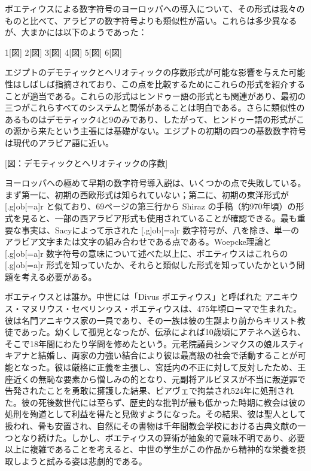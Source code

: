 \documentclass[a4paper,11pt,openany]{ltjsbook}
\begin{document}
ボエティウスによる数字符号のヨーロッパへの導入について、その形式は我々のものと比べて、アラビアの数字符号よりも類似性が高い。これらは多少異なるが、大まかには以下のようであった：

1[図]
  2[図]
  3[図]
  4[図]
  5[図]
  6[図]

エジプトのデモティックとヘリオティックの序数形式が可能な影響を与えた可能性はしばしば指摘されており、この点を比較するためにこれらの形式を紹介することが適当である。これらの形式はヒンドゥー語の形式とも関連があり、最初の三つがこれらすべてのシステムと関係があることは明白である。さらに類似性のあるものはデモティック4と9のみであり、したがって、ヒンドゥー語の形式がこの源から来たという主張には基礎がない。エジプトの初期の四つの基数数字符号は現代のアラビア語に近い。

[図：デモティックとヘリオティックの序数]

ヨーロッパへの極めて早期の数字符号導入説は、いくつかの点で失敗している。まず第一に、初期の西欧形式は知られていない；第二に、初期の東洋形式が [.g]ob[=a]r と似ており、69ページの第三行から Shiraz の手稿（約970年頃）の形式を見ると、一部の西アラビア形式も使用されていることが確認できる。最も重要な事実は、Sacyによって示された [.g]ob[=a]r 数字符号が、八を除き、単一のアラビア文字または文字の組み合わせである点である。Woepcke理論と [.g]ob[=a]r 数字符号の意味について述べた以上に、ボエティウスはこれらの [.g]ob[=a]r 形式を知っていたか、それらと類似した形式を知っていたかという問題を考える必要がある。

ボエティウスとは誰か。中世には「Divus ボエティウス」と呼ばれた アニキウス・マヌリウス・セベリンゥス・ボエティウスは、475年頃ローマで生まれた。彼は名門アニキウス家の一員であり、その一族は彼の生誕より前からキリスト教徒であった。幼くして孤児となったが、伝承によれば10歳頃にアテネへ送られ、そこで18年間にわたり学問を修めたという。元老院議員シンマクスの娘ルスティキアナと結婚し、両家の力強い結合により彼は最高級の社会で活動することが可能となった。彼は厳格に正義を主張し、宮廷内の不正に対して反対したため、王座近くの無恥な要素から憎しみの的となり、元副将アルビヌスが不当に叛逆罪で告発されたことを勇敢に擁護した結果、ピアヴェで拘禁され524年に処刑された。彼の死後数世代には至らず、歴史的な批判が最も低かった時期に教会は彼の処刑を殉道として利益を得たと見做すようになった。その結果、彼は聖人として扱われ、骨も安置され、自然にその書物は千年間教会学校における古典文献の一つとなり続けた。しかし、ボエティウスの算術が抽象的で意味不明であり、必要以上に複雑であることを考えると、中世の学生がこの作品から精神的な栄養を摂取しようと試みる姿は悲劇的である。
\end{document}
